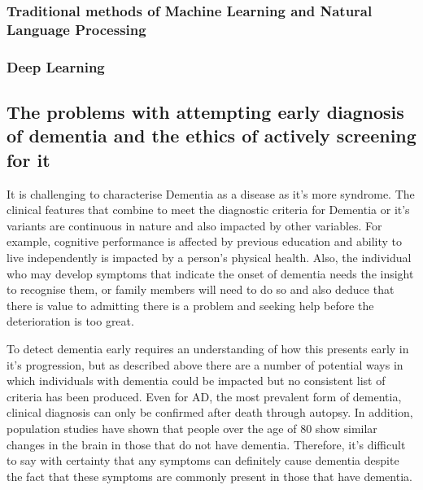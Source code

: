 \documentclass{article}
\begin{document}
\subsubsection{Traditional methods of Machine Learning and Natural Language Processing}

\subsubsection{Deep Learning}


\subsection{The problems with attempting early diagnosis of dementia and the ethics of actively screening for it}
It is challenging to characterise Dementia as a disease as it's more syndrome. The clinical features that combine to meet the diagnostic criteria for Dementia or it's variants are continuous in nature and also impacted by other variables. For example, cognitive performance is affected by previous education and ability to live independently is impacted by a person's physical health. Also, the individual who may develop symptoms that indicate the onset of dementia needs the insight to recognise them, or family members will need to do so and also deduce that there is value to admitting there is a problem and seeking help before the deterioration is too great. \newline
\par
To detect dementia early requires an understanding of how this presents early in it's progression, but as described above there are a number of potential ways in which individuals with dementia could be impacted but no consistent list of criteria has been produced. Even for AD, the most prevalent form of dementia, clinical diagnosis can only be confirmed after death through autopsy. In addition, population studies have shown that people over the age of 80 show similar changes in the brain in those that do not have dementia. Therefore, it's difficult to say with certainty that any symptoms can definitely cause dementia despite the fact that these symptoms are commonly present in those that have dementia. \newline
\par
\end{document}
